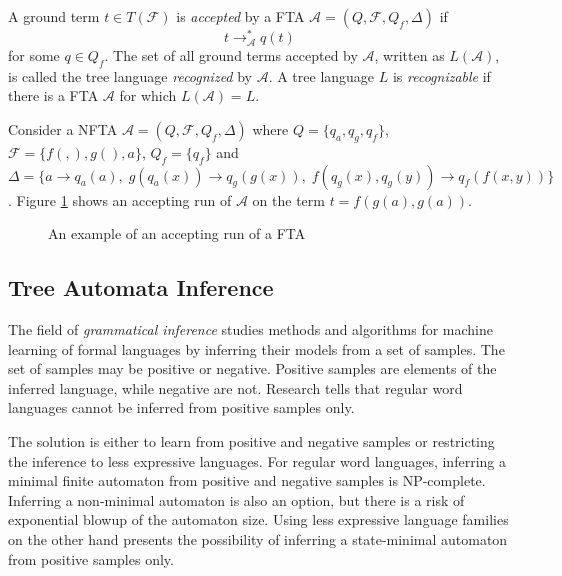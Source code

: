 \begin{defn}
A ground term $t \in T(\mathcal{F})$ is \emph{accepted} by a FTA $\mathcal{A} = (Q, \mathcal{F}, Q_f, \Delta)$ if $$t \rightarrow_{\mathcal{A}}^{*} q(t)$$ for some $q \in Q_f$. The set of all ground terms accepted by $\mathcal{A}$, written as $L(\mathcal{A})$, is called the tree language \emph{recognized} by $\mathcal{A}$. A tree language $L$ is \emph{recognizable} if there is a FTA $\mathcal{A}$ for which $L(\mathcal{A}) = L$.
\end{defn}

Consider a NFTA $\mathcal{A} = (Q, \mathcal{F}, Q_f, \Delta)$ where $Q = \{q_a, q_g, q_f\}$, $\mathcal{F} = \{f(,), g(), a\}$, $Q_f = \{q_f\}$ and $\Delta = \{a \rightarrow q_a(a), \; g(q_a(x)) \rightarrow q_g(g(x)), \; f(q_g(x), q_g(y)) \rightarrow q_f(f(x,y))\}$. Figure \ref{fig_ta_run} shows an accepting run of $\mathcal{A}$ on the term $t = f(g(a), g(a))$.

\begin{figure}[H]
    \centering
    \caption{An example of an accepting run of a FTA}
    \label{fig_ta_run}
\end{figure}

\subsection{Tree Automata Inference}
The field of \emph{grammatical inference} studies methods and algorithms for machine learning of formal languages by inferring their models from a set of samples. The set of samples may be positive or negative. Positive samples are elements of the inferred language, while negative are not. Research tells that regular word languages cannot be inferred from positive samples only\cite{Gold78}.

The solution is either to learn from positive and negative samples or restricting the inference to less expressive languages. For regular word languages, inferring a minimal finite automaton from positive and negative samples is NP-complete\cite{Gold78}. Inferring a non-minimal automaton is also an option, but there is a risk of exponential blowup of the automaton size. Using less expressive language families on the other hand presents the possibility of inferring a state-minimal automaton from positive samples only\cite{Garcia90}. 

